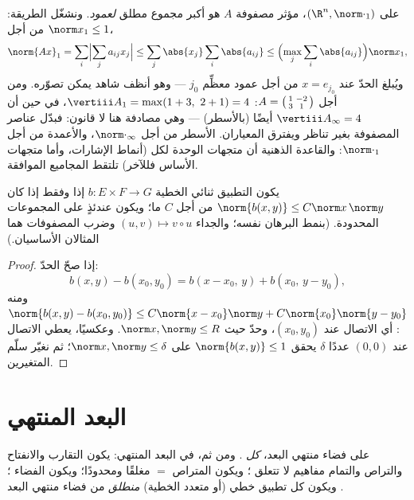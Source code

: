 \begin{example}\label{ex:b2:nvs:columnsums}
على $(\R^n, \norm\cdot_1)$،  مؤثر مصفوفة $A$ هو
أكبر مجموع مطلق \emph{لعمود}. ونشغّل الطريقة: من أجل
$\norm x_1 \leq 1$،
\[
\norm{Ax}_1 = \sum_i\Bigl|\sum_j a_{ij}x_j\Bigr|
\leq \sum_j \abs{x_j}\sum_i\abs{a_{ij}}
\leq \Bigl(\max_j\sum_i\abs{a_{ij}}\Bigr)\norm x_1 ,
\]
ويُبلغ الحدّ عند $x = e_{j_0}$ من أجل عمود معظِّم
$j_0$ --- وهو أنظف شاهد يمكن تصوّره. ومن أجل $A =
\begin{psmallmatrix}1 & -2\\ 3 & 1\end{psmallmatrix}$:
$\vertiii A_1 = \max(1 + 3,\ 2 + 1) = 4$، في حين أن
$\vertiii A_\infty = 4$ أيضًا (بالأسطر) --- وهي مصادفة هنا لا
قانون: فبدّل عناصر المصفوفة بغير تناظر ويفترق
المعياران. الأسطر من أجل $\norm\cdot_\infty$، والأعمدة من أجل
$\norm\cdot_1$: والقاعدة الذهنية أن متجهات الوحدة لكل 
(أنماط الإشارات، وأما متجهات الأساس فللآخر) تلتقط المجاميع
الموافقة.
\end{example}

\begin{proposition}\label{prop:b2:nvs:bilinear}
يكون التطبيق ثنائي الخطية $b \colon E \times F \to G$  إذا وفقط إذا كان
$\norm{b(x,y)} \leq C\norm x\,\norm y$ من أجل $C$ ما؛ ويكون عندئذٍ
 على المجموعات المحدودة. (بنمط البرهان نفسه؛ والجداء
$(u, v) \mapsto v \circ u$ وضرب المصفوفات هما المثالان
الأساسيان.)
\end{proposition}

\begin{proof}
إذا صحّ الحدّ:
\[
b(x,y) - b(x_0,y_0) = b(x - x_0,\, y) + b(x_0,\, y - y_0),
\]
ومنه $\norm{b(x,y) - b(x_0,y_0)} \leq C\norm{x - x_0}\norm y +
C\norm{x_0}\norm{y - y_0}$: أي الاتصال عند $(x_0, y_0)$، وحدّ
 حيث $\norm x, \norm y \leq R$. وعكسيًا، يعطي
الاتصال عند $(0,0)$ عددًا $\delta$ يحقق $\norm{b(x,y)} \leq 1$ على
$\norm x, \norm y \leq \delta$؛ ثم نغيّر سلّم المتغيرين.
\end{proof}

\section{البعد المنتهي}

\begin{theorem}\label{thm:b2:nvs:finitedim}
على فضاء منتهي البعد، \emph{كل }. ومن ثم، في البعد
المنتهي: يكون التقارب والانفتاح والتراص والتمام مفاهيم
لا تتعلق ؛ ويكون المتراص $=$ مغلقًا ومحدودًا؛
ويكون الفضاء ؛ ويكون كل تطبيق خطي (أو متعدد الخطية)
\emph{منطلق} من فضاء منتهي البعد .
\end{theorem}

